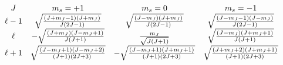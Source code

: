 \begin{equation*}
\begin{array}{cccc}
J & m_{s}=+1 & m_{s}=0 & m_{s}=-1 \\ 
\ell -1 & \sqrt{\frac{\left( J+m_{J}-1\right) (J+m_{J})}{J\left( 2J-1\right) 
}} & \sqrt{\frac{\left( J-m_{J}\right) \left( J+m_{J}\right) }{J\left(
2J-1\right) }} & \sqrt{\frac{\left( J-m_{J}-1\right) (J-m_{J})}{J\left(
2J-1\right) }} \\ 
\ell & -\sqrt{\frac{\left( J+m_{J}\right) (J-m_{J}+1)}{J\left( J+1\right) }}
& \frac{m_{J}}{\sqrt{J\left( J+1\right) }} & \sqrt{\frac{\left(
J-m_{J}\right) (J+m_{J}+1)}{J\left( J+1\right) }} \\ 
\ell +1 & \sqrt{\frac{\left( J-m_{J}+1\right) \left( J-m_{J}+2\right) }{%
\left( J+1\right) \left( 2J+3\right) }} & -\sqrt{\frac{\left(
J-m_{J}+1\right) \left( J+m_{J}+1\right) }{\left( J+1\right) \left(
2J+3\right) }} & \sqrt{\frac{\left( J+m_{J}+2\right) \left( J+m_{J}+1\right) 
}{\left( J+1\right) \left( 2J+3\right) }}
\end{array}
\end{equation*}

